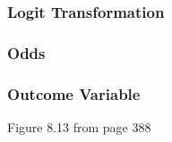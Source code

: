 \documentclass[slides]{beamer}
\newcommand{\blue}[1]{\textcolor{blue2}{#1}}
\begin{document}
\begin{frame}[fragile]
\frametitle{Logit Transformation}

%
%

\end{frame}


\begin{frame}[fragile]
\frametitle{Odds}

%
%
%
%
%
%
%

\end{frame}


\begin{frame}[fragile]
\frametitle{Outcome Variable}
Figure 8.13 from page 388

\vspace{6cm}

\end{frame}
\end{document}
